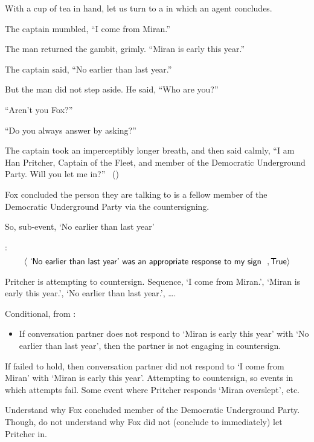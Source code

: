 \begin{note}
  With a cup of tea in hand, let us turn to a  in which an agent concludes.

  \begin{scenario}[Countersign]
    \indent The captain mumbled, ``I come from Miran.''

    The man returned the gambit, grimly.
    ``Miran is early this year.''

    The captain said, ``No earlier than last year.''

    But the man did not step aside.
    He said, ``Who are you?''

    ``Aren't you Fox?''

    ``Do you always answer by asking?''

    The captain took an imperceptibly longer breath, and then said calmly,
    ``I am Han Pritcher, Captain of the Fleet, and member of the Democratic Underground Party.
    Will you let me in?''%
    \mbox{ }\hfill\mbox{(\cite[70]{Asimov:1945aa})}%
    \newline
  \end{scenario}

  Fox concluded the person they are talking to is a fellow member of the Democratic Underground Party via the countersigning.

  So, sub-event, `No earlier than last year'

  :
  \[
    \pv{\propI{`No earlier than last year' was an appropriate response to my sign}}{\valI{True}}
  \]

  Pritcher is attempting to countersign.
  Sequence, `I come from Miran.', `Miran is early this year.', `No earlier than last year.', \dots.

  Conditional, from :
  \begin{itemize}
  \item
    If conversation partner does not respond to `Miran is early this year' with `No earlier than last year', then the partner is not engaging in countersign.
  \end{itemize}

  If \ros{} failed to hold, then conversation partner did not respond to `I come from Miran' with `Miran is early this year'.
  Attempting to countersign, so events in which attempts fail.
  Some event where Pritcher responds `Miran overslept', etc.
\end{note}

\begin{note}
  Understand why Fox concluded member of the Democratic Underground Party.
  Though, do not understand why Fox did not (conclude to immediately) let Pritcher in.
\end{note}

